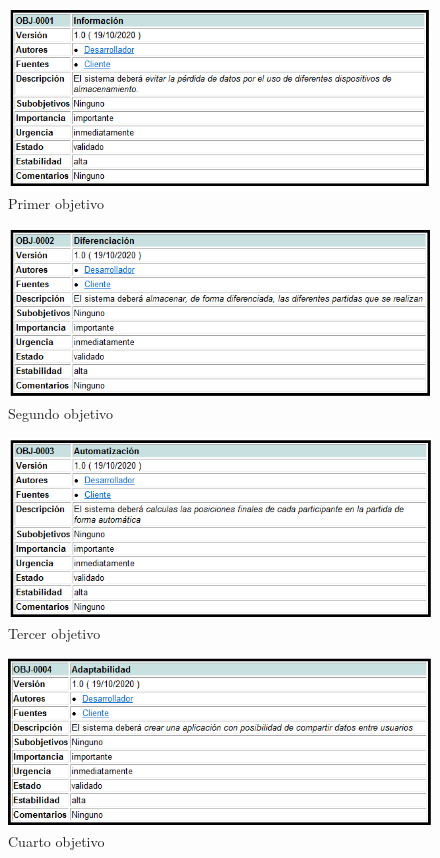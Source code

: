 \begin{figure}[H]
    \centering
    \includegraphics[width=1\linewidth]{fig/Objetivos del sistema/Imagen1.png}
    \caption{Primer objetivo}
    \label{fig:objetivo1}
\end{figure}
\begin{figure}[H]
    \centering
    \includegraphics[width=1\linewidth]{fig/Objetivos del sistema/Imagen2.png}
    \caption{Segundo objetivo}
    \label{fig:objetivo2}
\end{figure}
\begin{figure}[H]
    \centering
    \includegraphics[width=1\linewidth]{fig/Objetivos del sistema/Imagen3.png}
    \caption{Tercer objetivo}
    \label{fig:objetivo3}
\end{figure}
\begin{figure}[H]
    \centering
    \includegraphics[width=1\linewidth]{fig/Objetivos del sistema/Imagen4.png}
    \caption{Cuarto objetivo}
    \label{fig:objetivo4}
\end{figure}

